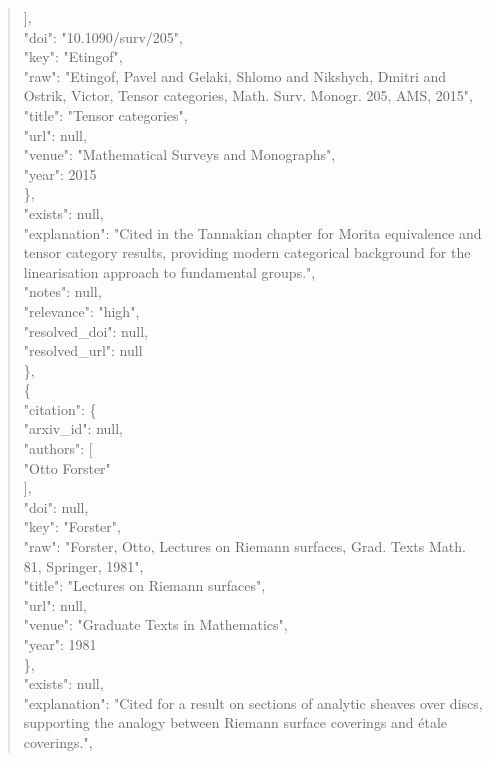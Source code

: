\documentclass[11pt]{article}
\begin{document}
\begin{quote}
        ],\\
        "doi": "10.1090/surv/205",\\
        "key": "Etingof",\\
        "raw": "Etingof, Pavel and Gelaki, Shlomo and Nikshych, Dmitri and Ostrik, Victor, Tensor categories, Math. Surv. Monogr. 205, AMS, 2015",\\
        "title": "Tensor categories",\\
        "url": null,\\
        "venue": "Mathematical Surveys and Monographs",\\
        "year": 2015\\
      \},\\
      "exists": null,\\
      "explanation": "Cited in the Tannakian chapter for Morita equivalence and tensor category results, providing modern categorical background for the linearisation approach to fundamental groups.",\\
      "notes": null,\\
      "relevance": "high",\\
      "resolved\_doi": null,\\
      "resolved\_url": null\\
    \},\\
    \{\\
      "citation": \{\\
        "arxiv\_id": null,\\
        "authors": [\\
          "Otto Forster"\\
        ],\\
        "doi": null,\\
        "key": "Forster",\\
        "raw": "Forster, Otto, Lectures on Riemann surfaces, Grad. Texts Math. 81, Springer, 1981",\\
        "title": "Lectures on Riemann surfaces",\\
        "url": null,\\
        "venue": "Graduate Texts in Mathematics",\\
        "year": 1981\\
      \},\\
      "exists": null,\\
      "explanation": "Cited for a result on sections of analytic sheaves over discs, supporting the analogy between Riemann surface coverings and étale coverings.",\\

\end{quote}
\end{document}
